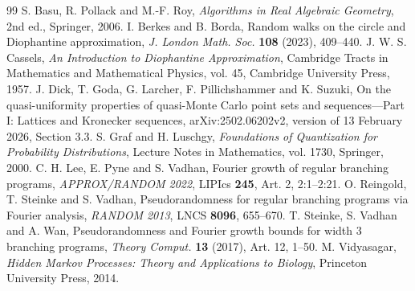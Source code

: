 \begin{thebibliography}{99}
 S. Basu, R. Pollack and M.-F. Roy,
\emph{Algorithms in Real Algebraic Geometry}, 2nd ed., Springer, 2006.
 I. Berkes and B. Borda,
Random walks on the circle and Diophantine approximation,
\emph{J. London Math. Soc.} \textbf{108} (2023), 409--440.
 J. W. S. Cassels,
\emph{An Introduction to Diophantine Approximation}, Cambridge Tracts in Mathematics and Mathematical Physics, vol. 45, Cambridge University Press, 1957.
 J. Dick, T. Goda, G. Larcher, F. Pillichshammer and K. Suzuki,
On the quasi-uniformity properties of quasi-Monte Carlo point sets and sequences---Part I: Lattices and Kronecker sequences,
arXiv:2502.06202v2, version of 13 February 2026, Section 3.3.
 S. Graf and H. Luschgy,
\emph{Foundations of Quantization for Probability Distributions}, Lecture Notes in Mathematics, vol. 1730, Springer, 2000.
 C. H. Lee, E. Pyne and S. Vadhan,
Fourier growth of regular branching programs,
\emph{APPROX/RANDOM 2022}, LIPIcs \textbf{245}, Art. 2, 2:1--2:21.
 O. Reingold, T. Steinke and S. Vadhan,
Pseudorandomness for regular branching programs via Fourier analysis,
\emph{RANDOM 2013}, LNCS \textbf{8096}, 655--670.
 T. Steinke, S. Vadhan and A. Wan,
Pseudorandomness and Fourier growth bounds for width 3 branching programs,
\emph{Theory Comput.} \textbf{13} (2017), Art. 12, 1--50.
 M. Vidyasagar,
\emph{Hidden Markov Processes: Theory and Applications to Biology}, Princeton University Press, 2014.


\end{thebibliography}
